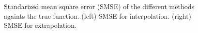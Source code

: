 \documentclass[]{interact}
\theoremstyle{plain}%
\theoremstyle{definition}
\theoremstyle{remark}
\begin{document}
\begin{figure}
\caption{Standarized mean square error (SMSE) of the different methods againts the true function. (left) SMSE for interpolation. (right) SMSE for extrapolation.}
  \label{fig17_RMSE_exII}
\end{figure}
\end{document}
